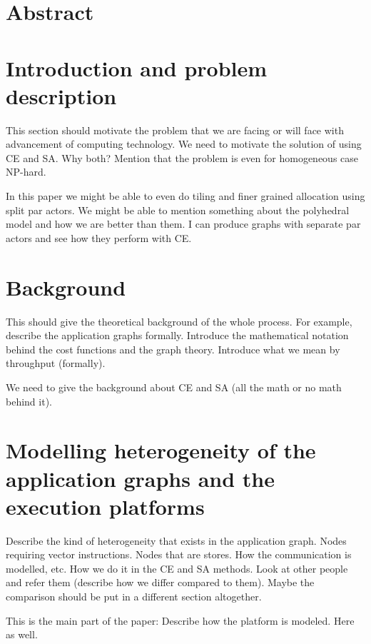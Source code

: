 \documentclass[10pt]{article}
\begin{document}
\section{Abstract}
\label{sec:abstract-2}

\section{Introduction and problem description}
\label{sec:intr-probl-descr}

This section should motivate the problem that we are facing or will face
with advancement of computing technology. We need to motivate the
solution of using CE and SA. Why both? Mention that the problem is even
for homogeneous case NP-hard.

In this paper we might be able to even do tiling and finer grained
allocation using split par actors. We might be able to mention something
about the polyhedral model and how we are better than them. I can
produce graphs with separate par actors and see how they perform with
CE.

\section{Background}
\label{sec:background}

This should give the theoretical background of the whole process. For
example, describe the application graphs formally. Introduce the
mathematical notation behind the cost functions and the graph
theory. Introduce what we mean by throughput (formally).

We need to give the background about CE and SA (all the math or no math
behind it).

\section{Modelling heterogeneity of the application graphs and the
  execution platforms}
\label{sec:model-heter-appl}

Describe the kind of heterogeneity that exists in the application
graph. Nodes requiring vector instructions. Nodes that are stores. How
the communication is modelled, etc. How we do it in the CE and SA
methods. Look at other people and refer them (describe how we differ
compared to them). Maybe the comparison should be put in a different
section altogether.

This is the main part of the paper: Describe how the platform is
modeled. Here as well.
\end{document}
